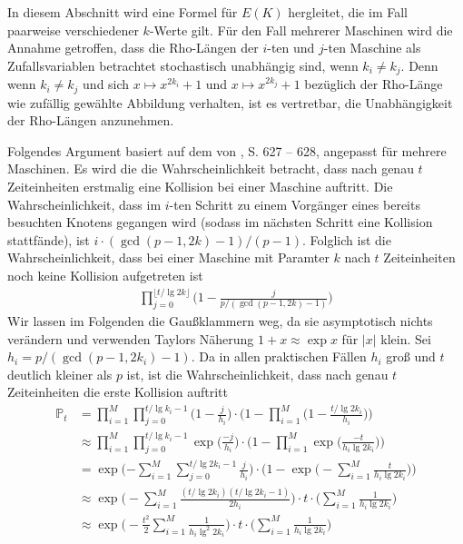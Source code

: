 \documentclass[a4paper, 10pt, ngerman]{article}
\begin{document}
In diesem Abschnitt wird eine Formel für $E(K)$ hergleitet, die im Fall paarweise verschiedener $k$-Werte gilt. Für den Fall mehrerer Maschinen wird die Annahme getroffen, dass die Rho-Längen der $i$-ten und $j$-ten Maschine als Zufallsvariablen betrachtet stochastisch unabhängig sind, wenn $k_i \ne k_j$. Denn wenn $k_i \ne k_j$ und sich $x \mapsto x^{2k_i} + 1$ und $x \mapsto x^{2k_j} + 1$ bezüglich der Rho-Länge wie zufällig gewählte Abbildung verhalten, ist es vertretbar, die Unabhängigkeit der Rho-Längen anzunehmen.

Folgendes Argument basiert auf dem von \cite{bp81}, S. 627 -- 628, angepasst für mehrere Maschinen. Es wird die die Wahrscheinlichkeit betracht, dass nach genau $t$ Zeiteinheiten erstmalig eine Kollision bei einer Maschine auftritt. Die Wahrscheinlichkeit, dass im $i$-ten Schritt zu einem Vorgänger eines bereits besuchten Knotens gegangen wird (sodass im nächsten Schritt eine Kollision stattfände), ist $i \cdot (\gcd(p - 1, 2k) - 1)/(p - 1)$. Folglich ist die Wahrscheinlichkeit, dass bei einer Maschine mit Paramter $k$ nach $t$ Zeiteinheiten noch keine Kollision aufgetreten ist
\begin{align*}
    \prod_{j = 0}^{\lfloor t / \lg 2k \rfloor} \bigg (1 - \frac {j} {p / (\gcd(p - 1, 2k) - 1)} \bigg )
\end{align*}
Wir lassen im Folgenden die Gaußklammern weg, da sie asymptotisch nichts verändern und verwenden Taylors Näherung $1 + x \approx \exp x$ für $|x|$ klein. Sei $h_i = p / (\gcd(p - 1, 2k_i) - 1)$. Da in allen praktischen Fällen $h_i$ groß und $t$ deutlich kleiner als $p$ ist, ist die Wahrscheinlichkeit, dass nach genau $t$ Zeiteinheiten die erste Kollision auftritt
\begin{align*}
    \mathbb{P}_t
     & = \prod_{i = 1}^M \prod_{j = 0}^{t / \lg k_i - 1}
    \Bigg (1 - \frac {j} {h_i} \Bigg ) \cdot \Bigg (1 - \prod_{i = 1}^M \Bigg (1 - \frac {t / \lg 2k_i} {h_i} \Bigg ) \Bigg )                                                            \\
     & \approx \prod_{i = 1}^M \prod_{j = 0}^{t / \lg k_i - 1} \exp \Bigg ( \frac {-j}{h_i} \Bigg ) \cdot \Bigg (1 - \prod_{i = 1}^M \exp \Bigg (\frac {-t}{h_i \lg 2k_i} \Bigg )\Bigg ) \\
     & = \exp \Bigg ({- \sum_{i = 1}^M \sum_{j = 0}^{t/\lg 2k_i - 1} \frac j {h_i}} \Bigg ) \cdot \Bigg (1 - \exp \Bigg ( -\sum_{i = 1}^M \frac t {h_i \lg 2k_i} \Bigg ) \Bigg )         \\
     & \approx \exp \Bigg (- \sum_{i = 1}^M \frac {(t/\lg 2k_i)(t/\lg 2k_i - 1)} {2h_i} \Bigg ) \cdot t \cdot \Bigg (\sum_{i = 1}^M \frac 1 {h_i \lg 2k_i} \Bigg )                       \\
     & \approx \exp \Bigg (- \frac {t^2} 2 \sum_{i = 1}^M \frac 1 {h_i \lg^2 2k_i} \Bigg ) \cdot t \cdot \Bigg (\sum_{i = 1}^M \frac 1 {h_i \lg 2k_i} \Bigg )
\end{align*}
\end{document}

